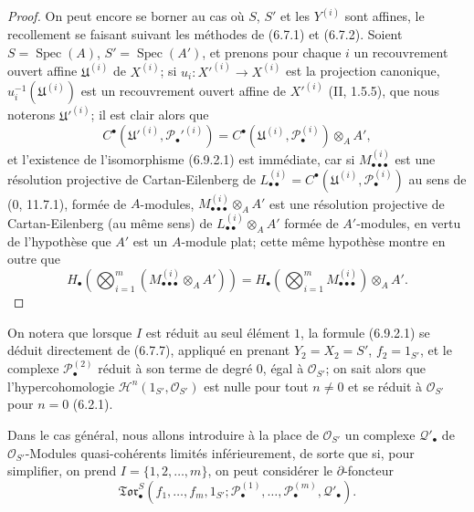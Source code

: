 \begin{proof}
On peut encore se borner au cas où $S$, $S'$ et les $Y^{(i)}$ sont affines,
le recollement se faisant suivant les méthodes de (6.7.1) et (6.7.2). Soient
$S=\operatorname{Spec}(A)$, $S'=\operatorname{Spec}(A')$, et prenons pour
chaque $i$ un recouvrement ouvert affine $\mathfrak U^{(i)}$ de $X^{(i)}$;
si $u_i:X'^{(i)}\to X^{(i)}$ est la projection canonique,
$u_i^{-1}(\mathfrak U^{(i)})$ est un recouvrement ouvert affine de
$X'^{(i)}$ (II, 1.5.5), que nous noterons $\mathfrak U'^{(i)}$; il est clair
alors que
\[
  C^\bullet(\mathfrak U'^{(i)},\mathscr P_\bullet'^{(i)})
  =C^\bullet(\mathfrak U^{(i)},\mathscr P_\bullet^{(i)})\otimes_A A',
\]
et l'existence de l'isomorphisme (6.9.2.1) est immédiate, car si
$M_{\bullet\bullet\bullet}^{(i)}$ est une résolution projective de
Cartan-Eilenberg de
$L_{\bullet\bullet}^{(i)}=C^\bullet(\mathfrak U^{(i)},
\mathscr P_\bullet^{(i)})$ au sens de (0, 11.7.1), formée de $A$-modules,
$M_{\bullet\bullet\bullet}^{(i)}\otimes_A A'$ est une résolution projective
de Cartan-Eilenberg (au même sens) de
$L_{\bullet\bullet}^{(i)}\otimes_A A'$ formée de $A'$-modules, en vertu de
l'hypothèse que $A'$ est un $A$-module plat; cette même hypothèse montre en
outre que
\[
  H_\bullet\left(
    \bigotimes_{i=1}^m
    (M_{\bullet\bullet\bullet}^{(i)}\otimes_A A')
  \right)
  =H_\bullet\left(
    \bigotimes_{i=1}^m M_{\bullet\bullet\bullet}^{(i)}
  \right)\otimes_A A'.
\]
\end{proof}

\begin{env}[6.9.2.2]
On notera que lorsque $I$ est réduit au seul élément $1$, la formule
(6.9.2.1) se déduit directement de (6.7.7), appliqué en prenant
$Y_2=X_2=S'$, $f_2=1_{S'}$, et le complexe $\mathscr P_\bullet^{(2)}$
réduit à son terme de degré $0$, égal à $\mathscr O_{S'}$; on sait alors que
l'hypercohomologie $\mathscr H^n(1_{S'},\mathscr O_{S'})$ est nulle pour tout
$n\ne0$ et se réduit à $\mathscr O_{S'}$ pour $n=0$ (6.2.1).
\end{env}

Dans le cas général, nous allons introduire à la place de $\mathscr O_{S'}$
un complexe $\mathscr Q'_\bullet$ de $\mathscr O_{S'}$-Modules
quasi-cohérents limités inférieurement, de sorte que si, pour simplifier, on
prend $I=\{1,2,\ldots,m\}$, on peut considérer le $\partial$-foncteur
\[
  \mathfrak{Tor}_\bullet^S
  (f_1,\ldots,f_m,1_{S'};
   \mathscr P_\bullet^{(1)},\ldots,\mathscr P_\bullet^{(m)},
   \mathscr Q'_\bullet).
\]

